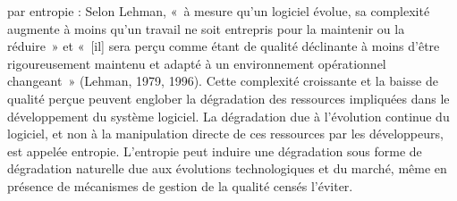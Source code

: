 {{\item par entropie : Selon Lehman, «~à mesure qu'un logiciel évolue, sa complexité augmente à moins qu'un travail ne soit entrepris pour la maintenir ou la réduire~» et «~[il] sera perçu comme étant de qualité déclinante à moins d'être rigoureusement maintenu et adapté à un environnement opérationnel changeant~» (Lehman, 1979, 1996). Cette complexité croissante et la baisse de qualité perçue peuvent englober la dégradation des ressources impliquées dans le développement du système logiciel. La dégradation due à l'évolution continue du logiciel, et non à la manipulation directe de ces ressources par les développeurs, est appelée entropie. L'entropie peut induire une dégradation sous forme de dégradation naturelle due aux évolutions technologiques et du marché, même en présence de mécanismes de gestion de la qualité censés l'éviter.
}{\cite{zabardast_assets_2022}}
\vspace{-1\baselineskip}
}{}

